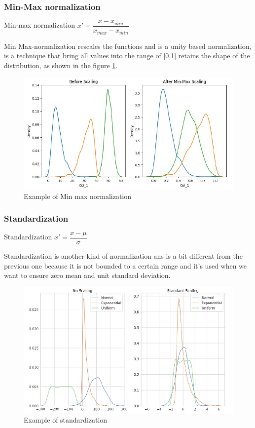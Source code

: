 \subsubsection{Min-Max normalization}
\begin{center}
    Min-max normalization  $x'= \dfrac{x-x_{min}}{x_{max} - x_{min}}$
\end{center}
Min Max-normalization rescales the functions and is a unity based
normalization, is a technique that bring all values into the range of
[0,1] retains the shape of the distribution, as shown in the figure 
\ref{fig:min-max-normalization}.
\begin{figure}[H]
    \centering
    \includegraphics[scale=0.5]{images/Data pre-process/MINMAX.png}
    \caption{Example of Min max normalization}
    \label{fig:min-max-normalization}
\end{figure}
\subsubsection{Standardization}

\begin{center}
    Standardization  $x'= \dfrac{x- \mu}{\sigma}$
\end{center}

Standardization is another kind of normalization ans is a bit
different from the previous one because it is not bounded to a certain
range and it's used when we want to ensure zero mean and
unit standard deviation.
\begin{figure}[H]
    \centering
    \includegraphics[scale=0.5]{images/Data pre-process/Standard.png}
    \caption{Example of standardization}
    \label{fig:enter-label}
\end{figure}

